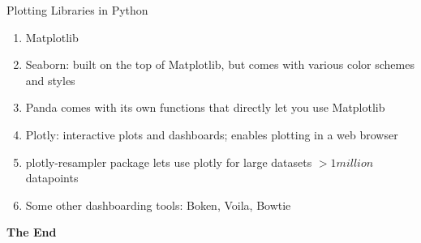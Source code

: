 \documentclass[aspectratio=169,xcolor=dvipsnames,svgnames,x11names,fleqn]{beamer}
\begin{document}
\begin{frame}{Plotting Libraries in Python}
\begin{enumerate}
    \item Matplotlib
    \item Seaborn: built on the top of Matplotlib, but comes with various color schemes and styles
    \item Panda comes with its own functions that directly let you use Matplotlib
    \item Plotly: interactive plots and dashboards; enables plotting in a web browser
    \item plotly-resampler package lets use plotly for large datasets $> 1 million$ datapoints
    \item Some other dashboarding tools: Boken, Voila, Bowtie
    
\end{enumerate}

\end{frame}



    \begin{frame}
        \Huge{\centerline{\color{MediumBlue}\textbf{The End}}}
    \end{frame}
\end{document}
